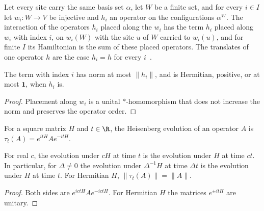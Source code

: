 \begin{definition}
    \label{def:dynamics_interaction_translates}
    \leanok
    Let every site carry the same basis set $\alpha$, let $W$ be a finite set, and for
    every $i\in I$ let $w_i\colon W\to V$ be injective and $h_i$ an operator on the
    configurations $\alpha^W$. The interaction of the operators $h_i$ placed along the
    $w_i$ has the term $h_i$ placed along $w_i$ with index $i$, on $w_i(W)$ with the site
    $u$ of $W$ carried to $w_i(u)$, and for finite $I$ its Hamiltonian is the sum of these
    placed operators. The translates of one operator $h$ are the case $h_i=h$ for every
    $i$~\cite{Schuch2011Phases}.
\end{definition}

\begin{lemma}
    \label{lem:dynamics_interaction_translates}
    \leanok
    The term with index $i$ has norm at most $\lVert h_i\rVert$, and is Hermitian, positive,
    or at most $\mathbf 1$, when $h_i$ is.
\end{lemma}
\begin{proof}
    \leanok
    Placement along $w_i$ is a unital $*$-homomorphism that does not increase the norm
    and preserves the operator order.
\end{proof}

\begin{definition}
    \label{def:dynamics_heisenberg}
    \leanok
    For a square matrix $H$ and $t\in\R$, the Heisenberg evolution of an
    operator $A$ is $\tau_t(A)=e^{itH}Ae^{-itH}$.
\end{definition}

\begin{lemma}
    \label{lem:dynamics_time_scaling}
    \leanok
    For real $c$, the evolution under $cH$ at time $t$ is the evolution under
    $H$ at time $ct$. In particular, for $\Delta\neq0$ the evolution under
    $\Delta^{-1}H$ at time $\Delta t$ is the evolution under $H$ at time $t$.
    For Hermitian $H$, $\lVert\tau_t(A)\rVert=\lVert A\rVert$.
\end{lemma}
\begin{proof}\leanok
    Both sides are $e^{ictH}Ae^{-ictH}$. For Hermitian $H$ the matrices
    $e^{\pm itH}$ are unitary.
\end{proof}

